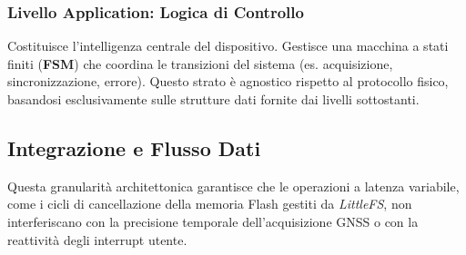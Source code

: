 \subsubsection*{Livello Application: Logica di Controllo}
Costituisce l'intelligenza centrale del dispositivo. Gestisce una macchina a stati finiti (\textbf{FSM}) che coordina le transizioni del sistema (es. acquisizione, sincronizzazione, errore). Questo strato è agnostico rispetto al protocollo fisico, basandosi esclusivamente sulle strutture dati fornite dai livelli sottostanti.

\subsection{Integrazione e Flusso Dati}

Questa granularità architettonica garantisce che le operazioni a latenza variabile, come i cicli di cancellazione della memoria Flash gestiti da \textit{LittleFS}, non interferiscano con la precisione temporale dell'acquisizione GNSS o con la reattività degli interrupt utente.